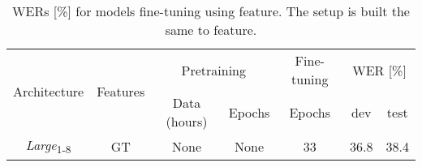 \begin{table}[!h]
\centering
\begin{adjustbox}{width=\columnwidth,center}
\begin{tabular}{|c|c|c|c|c|c|c|} 
\hline
\multirow{2}{*}{Architecture} & \multirow{2}{*}{Features} & \multicolumn{2}{c|}{Pretraining} & Fine-tuning & \multicolumn{2}{c|}{WER [\%]}  \\ 
\cline{3-7}
                              &                           & Data (hours) & Epochs            & Epochs      & dev  & test                    \\ 
\hline
\textit{Large}\textsubscript{1-8}             & GT                        & None         & None              & 33          & 36.8 & 38.4                    \\
\hline
\end{tabular}
\end{adjustbox}
\caption{\glspl{WER} {[}\%{]} for models fine-tuning using  feature. The setup is built the same to  feature.}
\label{table:feature_compare}
\end{table}